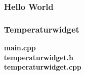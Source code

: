 
\subsubsection{Hello World}

\clearpage

\subsubsection{Temperaturwidget}
\textbf{main.cpp}
\\

\textbf{temperaturwidget.h}
\\

\newpage
\textbf{temperaturwidget.cpp}
